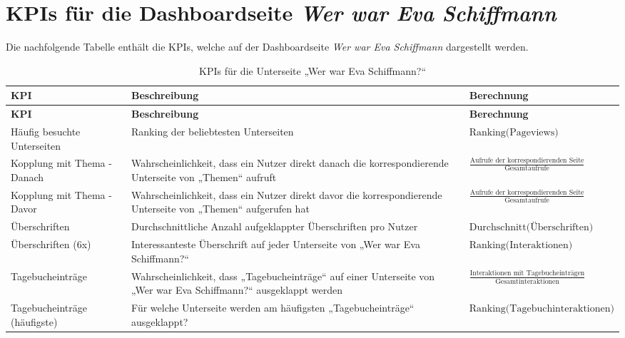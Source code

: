 \section{KPIs für die Dashboardseite \textit{Wer war Eva Schiffmann}}
Die nachfolgende Tabelle enthält die KPIs, welche auf der Dashboardseite \textit{Wer war Eva Schiffmann} dargestellt werden.

\renewcommand{\arraystretch}{1.5} %
\begin{xltabular}{\textwidth}{|X|X|X|}
    \caption{KPIs für die Unterseite „Wer war Eva Schiffmann?“} \label{tab:kpi_eva_schiffmann} \\
    \hline
    \textbf{KPI} & \textbf{Beschreibung} & \textbf{Berechnung} \\ \hline
    \endfirsthead

    \hline
    \textbf{KPI} & \textbf{Beschreibung} & \textbf{Berechnung} \\ \hline
    \endhead

    \hline
    \endfoot

    \hline
    \endlastfoot

    Häufig besuchte Unterseiten & Ranking der beliebtesten Unterseiten & {\footnotesize \(\text{Ranking(Pageviews)}\)} \\ \hline
    Kopplung mit Thema - Danach & Wahrscheinlichkeit, dass ein Nutzer direkt danach die korrespondierende Unterseite von „Themen“ aufruft & {\footnotesize \(\frac{\text{Aufrufe der korrespondierenden Seite}}{\text{Gesamtaufrufe}}\)} \\ \hline
    Kopplung mit Thema - Davor & Wahrscheinlichkeit, dass ein Nutzer direkt davor die korrespondierende Unterseite von „Themen“ aufgerufen hat & {\footnotesize \(\frac{\text{Aufrufe der korrespondierenden Seite}}{\text{Gesamtaufrufe}}\)} \\ \hline
    Überschriften & Durchschnittliche Anzahl aufgeklappter Überschriften pro Nutzer & {\footnotesize \(\text{Durchschnitt(Überschriften)}\)} \\ \hline
    Überschriften (6x) & Interessanteste Überschrift auf jeder Unterseite von „Wer war Eva Schiffmann?“ & {\footnotesize \(\text{Ranking(Interaktionen)}\)} \\ \hline
    Tagebucheinträge & Wahrscheinlichkeit, dass „Tagebucheinträge“ auf einer Unterseite von „Wer war Eva Schiffmann?“ ausgeklappt werden & {\footnotesize \(\frac{\text{Interaktionen mit Tagebucheinträgen}}{\text{Gesamtinteraktionen}}\)} \\ \hline
    Tagebucheinträge (häufigste) & Für welche Unterseite werden am häufigsten „Tagebucheinträge“ ausgeklappt? & {\footnotesize \(\text{Ranking(Tagebuchinteraktionen)}\)} \\ \hline
\end{xltabular}

